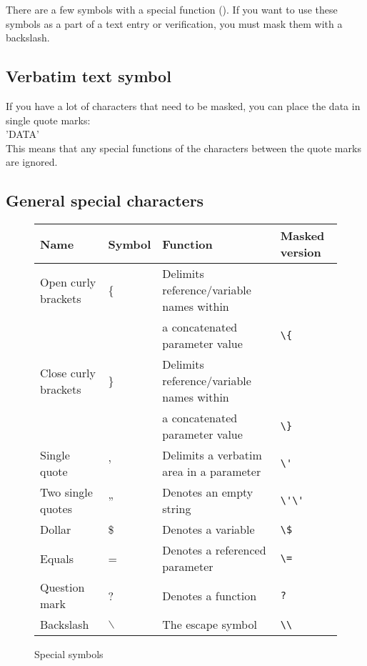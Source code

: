 There are a few symbols with a special function (). If you want to use these symbols as a part of a text entry or verification, you must mask them with a backslash. 


\subsection{Verbatim text symbol}
\label{verbatimsymbol}
If you have a lot of characters that need to be masked, you can place the data in single quote marks:\\
'DATA'\\
 This means that any special functions of the characters between the quote marks are ignored. 

\subsection{General special characters}
\begin{figure}
\begin{tabular}{|l|l|l|l|} \hline
\centering
Name & Symbol & Function & Masked version \\ \hline
Open curly brackets & \{ & Delimits reference/variable names within\\
&& a concatenated parameter value & \verb+\{+\\ \hline
Close curly brackets &\} & Delimits reference/variable names within\\
&& a concatenated parameter value & \verb+\}+\\ \hline
Single quote &' & Delimits a verbatim area in a parameter &\verb+\'+\\ \hline
Two single quotes & '' & Denotes an empty string & \verb+\'\'+\\ \hline
Dollar &\$ & Denotes a variable &\verb+\$+\\ \hline
Equals & = & Denotes a referenced parameter & \verb+\=+\\ \hline
Question mark & ? & Denotes a function & \verb+?+\\ \hline
Backslash &$\backslash$& The escape symbol & \verb+\\+\\ \hline
\end{tabular}
\label{specialchars}
\caption{Special symbols}
\end{figure}
\clearpage

